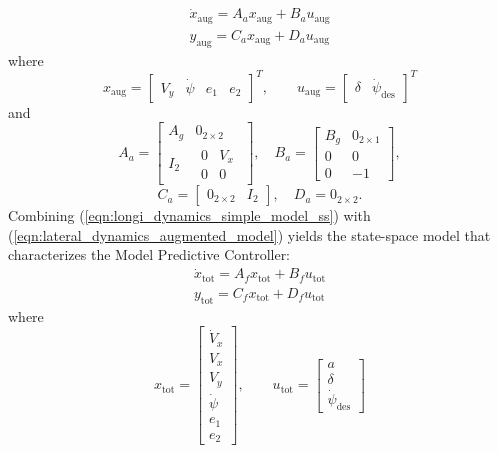 \documentclass[conference,11pt]{IEEEtran}
\renewcommand{\vec}[1]{\ensuremath{\boldsymbol{\mathit{#1}}}}
\begin{document}
\begin{equation}
\label{eqn:lateral_dynamics_augmented_model}
\begin{array}{ll}
\dot{\vec{x}}_{\text{aug}} =\vec{A}_a \vec{x}_{\text{aug}}+ \vec{B}_a \vec{u}_{\text{aug}}\\
\vec{y}_{\text{aug}} = \vec{C}_a \vec{x}_{\text{aug}} + \vec{D}_a \vec{u}_{\text{aug}}
\end{array}
\end{equation}
where
\begin{equation*}
\vec{x}_{\text{aug}} = \begin{bmatrix}
V_y&\dot{\psi}&e_1&e_2
\end{bmatrix}^T,
\qquad
\vec{u}_{\text{aug}} = 
\begin{bmatrix}
\delta&\dot{\psi}_{\text{des}}
\end{bmatrix}^T
\end{equation*}
and
\[ 
\vec{A}_a=\begin{bmatrix}
\vec{A}_g&\vec{0}_{2\times2}\\
\vec{I}_2&\begin{matrix}
0&V_x\\
0&0
\end{matrix}
\end{bmatrix},
\quad
\vec{B}_a=\begin{bmatrix}
\vec{B}_g&\vec{0}_{2\times1}\\
0&0\\
0&-1
\end{bmatrix},
\]
\[
C_a=\begin{bmatrix}
\vec{0}_{2\times2}&\vec{I}_2
\end{bmatrix}, 
\quad
D_a=
\vec{0}_{2\times2}. 
\]
Combining (\ref{eqn:longi_dynamics_simple_model_ss}) with (\ref{eqn:lateral_dynamics_augmented_model}) yields the state-space model that characterizes the Model Predictive Controller:
\begin{equation}
\label{eqn:full_dynamics_model}
\begin{array}{ll}
\dot{\vec{x}}_{\text{tot}} = \vec{A}_f \vec{x}_{\text{tot}}+ \vec{B}_f \vec{u}_{\text{tot}}\\
\vec{y}_{\text{tot}} = \vec{C}_f \vec{x}_{\text{tot}} + \vec{D}_f \vec{u}_{\text{tot}}
\end{array}
\end{equation}
where
\begin{equation*}
\vec{x}_{\text{tot}} = \begin{bmatrix}
\dot{V}_x\\V_x\\V_y\\\dot{\psi}\\e_1\\e_2
\end{bmatrix},
\qquad
\vec{u}_{\text{tot}} = 
\begin{bmatrix}
a\\\delta\\\dot{\psi}_{\text{des}}
\end{bmatrix}
\end{equation*}
\end{document}
